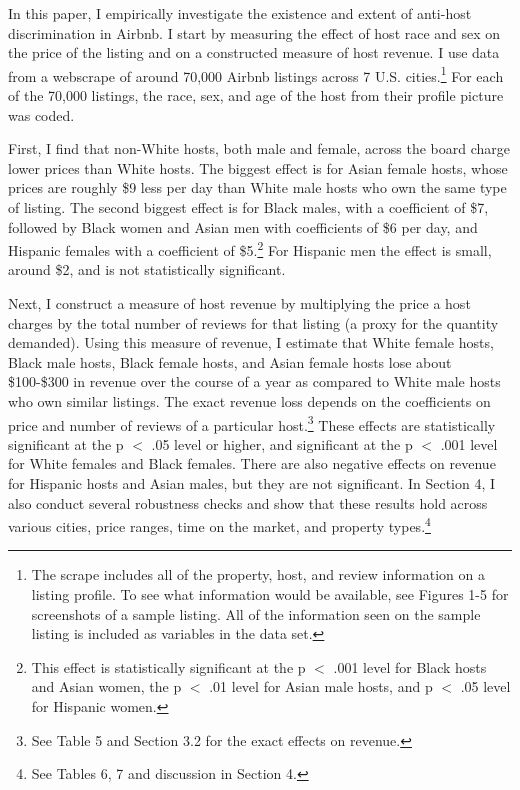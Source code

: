\documentclass[11pt, oneside]{article}
\begin{document}
In this paper, I empirically investigate the existence and extent of anti-host discrimination in Airbnb. I start by measuring the effect of host race and sex on the price of the listing and on a constructed measure of host revenue. I use data from a webscrape of around 70,000 Airbnb listings across 7 U.S. cities.\footnote{The scrape includes all of the property, host, and review information on a listing profile. To see what information would be available, see Figures 1-5 for screenshots of a sample listing. All of the information seen on the sample listing is included as variables in the data set.} For each of the 70,000 listings, the race, sex, and age of the host from their profile picture was coded. 

First, I find that non-White hosts, both male and female, across the board charge lower prices than White hosts. The biggest effect is for Asian female hosts, whose prices are roughly \$9 less per day than White male hosts who own the same type of listing. The second biggest effect is for Black males, with a coefficient of \$7, followed by Black women and Asian men with coefficients of \$6 per day, and Hispanic females with a coefficient of \$5.\footnote{This effect is statistically significant at the p $<$ .001 level for Black hosts and Asian women, the p $<$ .01 level for Asian male hosts, and p $<$ .05 level for Hispanic women.} For Hispanic men the effect is small, around \$2, and is not statistically significant.
    
Next, I construct a measure of host revenue by multiplying the price a host charges by the total number of reviews for that listing (a proxy for the quantity demanded). Using this measure of revenue, I estimate that White female hosts, Black male hosts, Black female hosts, and Asian female hosts lose about \$100-\$300 in revenue over the course of a year as compared to White male hosts who own similar listings. The exact revenue loss depends on the coefficients on price and number of reviews of a particular host.\footnote{See Table 5 and Section 3.2 for the exact effects on revenue.} These effects are statistically significant at the p $<$ .05 level or higher, and significant at the p $<$ .001 level for White females and Black females. There are also negative effects on revenue for Hispanic hosts and Asian males, but they are not significant. In Section 4, I also conduct several robustness checks and show that these results hold across various cities, price ranges, time on the market, and property types.\footnote{See Tables 6, 7 and discussion in Section 4.}
\end{document}
